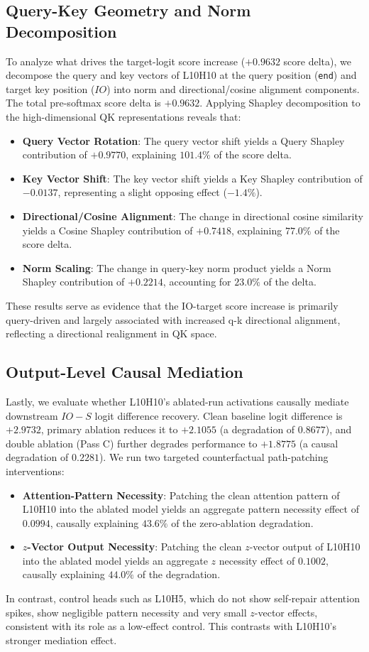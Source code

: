 \documentclass[12pt,a4paper]{article}
\begin{document}
\subsection{Query-Key Geometry and Norm Decomposition}
To analyze what drives the target-logit score increase ($+0.9632$ score delta), we decompose the query and key vectors of L10H10 at the query position (\texttt{end}) and target key position ($IO$) into norm and directional/cosine alignment components. 
The total pre-softmax score delta is $+0.9632$. Applying Shapley decomposition to the high-dimensional QK representations reveals that:
\begin{itemize}
  \item \textbf{Query Vector Rotation}: The query vector shift yields a Query Shapley contribution of $+0.9770$, explaining $101.4\%$ of the score delta.
  \item \textbf{Key Vector Shift}: The key vector shift yields a Key Shapley contribution of $-0.0137$, representing a slight opposing effect ($-1.4\%$).
  \item \textbf{Directional/Cosine Alignment}: The change in directional cosine similarity yields a Cosine Shapley contribution of $+0.7418$, explaining $77.0\%$ of the score delta.
  \item \textbf{Norm Scaling}: The change in query-key norm product yields a Norm Shapley contribution of $+0.2214$, accounting for $23.0\%$ of the delta.
\end{itemize}
These results serve as evidence that the IO-target score increase is primarily query-driven and largely associated with increased q-k directional alignment, reflecting a directional realignment in QK space.

\subsection{Output-Level Causal Mediation}
Lastly, we evaluate whether L10H10's ablated-run activations causally mediate downstream $IO - S$ logit difference recovery. Clean baseline logit difference is $+2.9732$, primary ablation reduces it to $+2.1055$ (a degradation of $0.8677$), and double ablation (Pass C) further degrades performance to $+1.8775$ (a causal degradation of $0.2281$).
We run two targeted counterfactual path-patching interventions:
\begin{itemize}
  \item \textbf{Attention-Pattern Necessity}: Patching the clean attention pattern of L10H10 into the ablated model yields an aggregate pattern necessity effect of $0.0994$, causally explaining $43.6\%$ of the zero-ablation degradation.
  \item \textbf{$z$-Vector Output Necessity}: Patching the clean $z$-vector output of L10H10 into the ablated model yields an aggregate $z$ necessity effect of $0.1002$, causally explaining $44.0\%$ of the degradation.
\end{itemize}
In contrast, control heads such as L10H5, which do not show self-repair attention spikes, show negligible pattern necessity and very small $z$-vector effects, consistent with its role as a low-effect control. This contrasts with L10H10’s stronger mediation effect.
\end{document}
